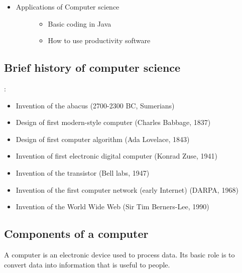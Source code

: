 \documentclass[letterpaper,10pt,english,openany,oneside]{sphinxmanual}
\begin{document}
\begin{itemize}
\item {} \begin{description}
\item[{Applications of Computer science}] \leavevmode\begin{itemize}
\item {} 
Basic coding in Java

\item {} 
How to use productivity software

\end{itemize}

\end{description}

\end{itemize}


\subsection{Brief history of computer science}
\label{\detokenize{introduction:brief-history-of-computer-science}}
:
\begin{itemize}
\item {} 
Invention of the abacus (2700-2300 BC, Sumerians)

\item {} 
Design of first modern-style computer (Charles Babbage, 1837)

\item {} 
Design of first computer algorithm (Ada Lovelace, 1843)

\item {} 
Invention of first electronic digital computer (Konrad Zuse, 1941)

\item {} 
Invention of the transistor (Bell labs, 1947)

\item {} 
Invention of the first computer network (early Internet) (DARPA, 1968)

\item {} 
Invention of the World Wide Web (Sir Tim Berners-Lee, 1990)

\end{itemize}


\subsection{Components of a computer}
\label{\detokenize{introduction:components-of-a-computer}}
A computer is an electronic device used to process data. Its basic role is to convert data into information that is useful to people.
\end{document}

